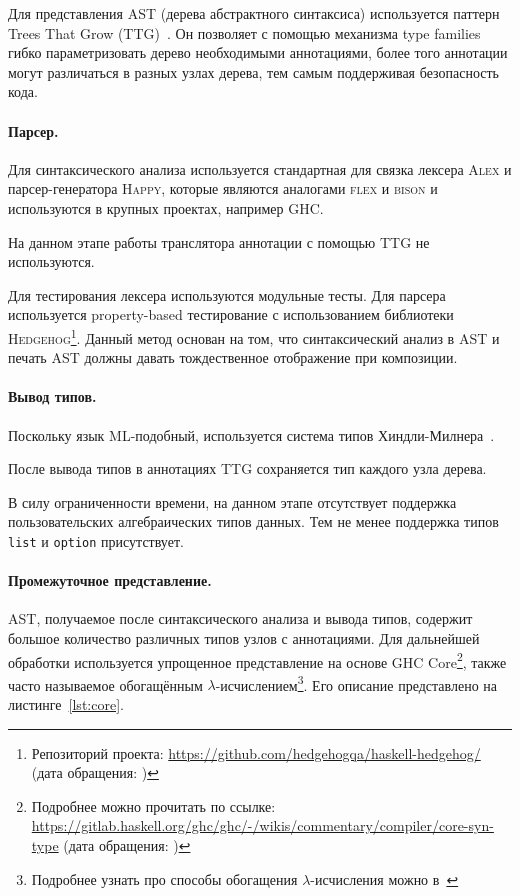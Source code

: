 Для представления AST (дерева абстрактного синтаксиса) используется паттерн Trees That Grow (TTG)~\cite{shayannajdTreesThatGrow}.
Он позволяет с помощью механизма type families~\cite{schrijversTypeCheckingOpen2008} гибко параметризовать дерево необходимыми аннотациями, более того аннотации могут различаться в разных узлах дерева, тем самым поддерживая безопасность кода.

\paragraph{Парсер.}

Для синтаксического анализа используется стандартная для \Haskell{} связка лексера \textsc{Alex} и парсер-генератора \textsc{Happy}, которые являются аналогами \textsc{flex} и \textsc{bison} и используются в крупных проектах, например GHC.

На данном этапе работы транслятора аннотации с помощью TTG не используются.

Для тестирования лексера используются модульные тесты.
Для парсера используется property-based тестирование с использованием библиотеки \textsc{Hedgehog}\footnote{Репозиторий проекта: \url{https://github.com/hedgehogqa/haskell-hedgehog/} (дата обращения: )}.
Данный метод основан на том, что синтаксический анализ в AST и печать AST должны давать тождественное отображение при композиции.

\paragraph{Вывод типов.}

Поскольку язык ML-подобный, используется система типов Хиндли-Милнера~\cite{hindleyPrincipalTypeSchemeObject1969, milnerTheoryTypePolymorphism1978}.

После вывода типов в аннотациях TTG сохраняется тип каждого узла дерева.

В силу ограниченности времени, на данном этапе отсутствует поддержка пользовательских алгебраических типов данных.
Тем не менее поддержка типов \texttt{list} и \texttt{option} присутствует.

\paragraph{Промежуточное представление.}

AST, получаемое после синтаксического анализа и вывода типов, содержит большое количество различных типов узлов с аннотациями.
Для дальнейшей обработки используется упрощенное представление на основе GHC Core\footnote{Подробнее можно прочитать по ссылке: \url{https://gitlab.haskell.org/ghc/ghc/-/wikis/commentary/compiler/core-syn-type} (дата обращения: )}, также часто называемое обогащённым $\lambda$-исчислением\footnote{Подробнее узнать про способы обогащения $\lambda$-исчисления можно в~\cite[раздел~3.2]{peytonjones1987the}}.
Его описание представлено на листинге~\ref{lst:core}.

